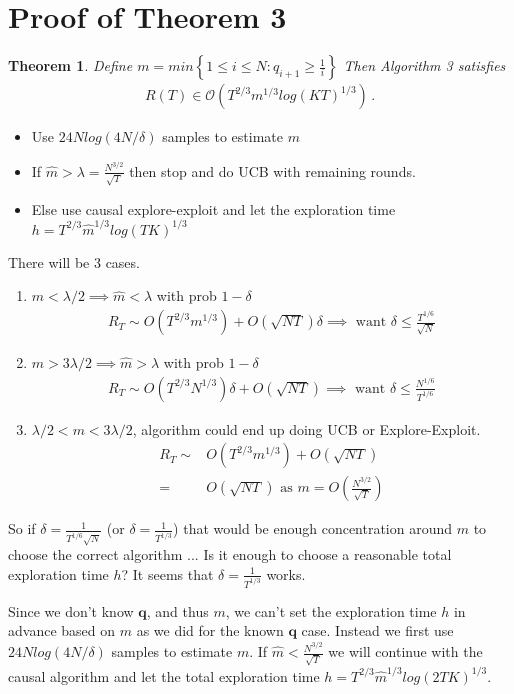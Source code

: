 \documentclass{article}
\newcommand{\set}[1]{\left\{#1\right\}}
\newcommand{\eq}[1]{\begin{align*}#1\end{align*}}
\newcommand{\bigo}[1]{\mathcal{O}\left( #1 \right)}
\theoremstyle{plain}
\newtheorem{theorem}{Theorem}
\theoremstyle{definition}
\begin{document}
\section{Proof of Theorem 3}

\begin{theorem}\label{thm:unknown_q_regret}
Define $m =   min\set{1 \leq i \leq N:q_{i+1} \geq \frac{1}{i}}$
Then Algorithm 3 satisfies
\eq{
R(T) \in \bigo{T^{2/3}m^{1/3}log(KT)^{1/3}}\,.
}
\end{theorem}

\begin{itemize}
\item Use $24Nlog(4N/\delta)$ samples to estimate $m$
\item If $\hat m > \lambda = \frac{N^{3/2}}{\sqrt{T}}$ then stop and do UCB with remaining rounds.
\item Else use causal explore-exploit and let the exploration time $h = T^{2/3}\hat{m}^{1/3}log(TK)^{1/3}$ 
\end{itemize}

There will be 3 cases.
\begin{enumerate}
\item $m < \lambda/2 \implies \hat{m} < \lambda$ with prob $1-\delta$
\eq {
R_T \sim O(T^{2/3}m^{1/3}) + O(\sqrt{NT})\delta \implies \text { want } \delta \leq \frac{T^{1/6}}{\sqrt{N}}
}
\item $m > 3\lambda/2 \implies \hat{m} > \lambda$ with prob $1-\delta$
\eq {
R_T \sim O(T^{2/3}N^{1/3})\delta + O(\sqrt{NT}) \implies \text { want } \delta \leq \frac{N^{1/6}}{T^{1/6}}
}
\item $\lambda/2 < m < 3\lambda/2$, algorithm could end up doing UCB or Explore-Exploit.
\eq{
R_T \sim  & O(T^{2/3}m^{1/3}) + O(\sqrt{NT}) \\
= &  O(\sqrt{NT}) \text { as } m = O(\frac{N^{3/2}}{\sqrt{T}})
}
\end{enumerate}

So if $\delta = \frac{1}{T^{1/6}\sqrt{N}}$ (or $\delta = \frac{1}{T^{1/3}}$) that would be enough concentration around $m$ to choose the correct algorithm ... Is it enough to choose a reasonable total exploration time $h$? It seems that $\delta = \frac{1}{T^{1/3}}$ works.




Since we don't know $\boldsymbol{q}$, and thus $m$, we can't set the exploration time $h$ in advance based on $m$ as we did for the known $\boldsymbol{q}$ case. Instead we first use $24Nlog(4N/\delta)$ samples to estimate $m$. If $\hat m < \frac{N^{3/2}}{\sqrt{T}}$ we will continue with the causal algorithm and let the total exploration time $h = T^{2/3}\hat{m}^{1/3}log(2TK)^{1/3}$. 
\end{document}
